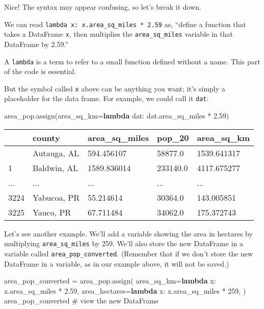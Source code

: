 \documentclass[
  letterpaper,
  DIV=11,
  numbers=noendperiod]{scrreprt}
\newenvironment{Shaded}{\begin{snugshade}}{\end{snugshade}}
\newcommand{\CommentTok}[1]{\textcolor[rgb]{0.37,0.37,0.37}{#1}}
\newcommand{\DecValTok}[1]{\textcolor[rgb]{0.68,0.00,0.00}{#1}}
\newcommand{\FloatTok}[1]{\textcolor[rgb]{0.68,0.00,0.00}{#1}}
\newcommand{\KeywordTok}[1]{\textcolor[rgb]{0.00,0.23,0.31}{\textbf{#1}}}
\newcommand{\NormalTok}[1]{\textcolor[rgb]{0.00,0.23,0.31}{#1}}
\newcommand{\OperatorTok}[1]{\textcolor[rgb]{0.37,0.37,0.37}{#1}}
\begin{document}
Nice! The syntax may appear confusing, so let's break it down.

We can read \texttt{lambda\ x:\ x.area\_sq\_miles\ *\ 2.59} as, ``define
a function that takes a DataFrame \texttt{x}, then multiplies the
\texttt{area\_sq\_miles} variable in that DataFrame by 2.59.''

A \texttt{lambda} is a term to refer to a small function defined without
a name. This part of the code is essential.

But the symbol called \texttt{x} above can be anything you want; it's
simply a placeholder for the data frame. For example, we could call it
\texttt{dat}:

\begin{Shaded}
\begin{Highlighting}[]
\NormalTok{area\_pop.assign(area\_sq\_km}\OperatorTok{=}\KeywordTok{lambda}\NormalTok{ dat: dat.area\_sq\_miles }\OperatorTok{*} \FloatTok{2.59}\NormalTok{)}
\end{Highlighting}
\end{Shaded}

\begin{longtable}[]{@{}lllll@{}}
\toprule\noalign{}
& county & area\_sq\_miles & pop\_20 & area\_sq\_km \\
\midrule\noalign{}
\endhead
\bottomrule\noalign{}
\endlastfoot
0 & Autauga, AL & 594.456107 & 58877.0 & 1539.641317 \\
1 & Baldwin, AL & 1589.836014 & 233140.0 & 4117.675277 \\
... & ... & ... & ... & ... \\
3224 & Yabucoa, PR & 55.214614 & 30364.0 & 143.005851 \\
3225 & Yauco, PR & 67.711484 & 34062.0 & 175.372743 \\
\end{longtable}

Let's see another example. We'll add a variable showing the area in
hectares by multiplying \texttt{area\_sq\_miles} by 259. We'll also
store the new DataFrame in a variable called
\texttt{area\_pop\_converted}. (Remember that if we don't store the new
DataFrame in a variable, as in our example above, it will not be saved.)

\begin{Shaded}
\begin{Highlighting}[]
\NormalTok{area\_pop\_converted }\OperatorTok{=}\NormalTok{ area\_pop.assign(}
\NormalTok{    area\_sq\_km}\OperatorTok{=}\KeywordTok{lambda}\NormalTok{ x: x.area\_sq\_miles }\OperatorTok{*} \FloatTok{2.59}\NormalTok{,}
\NormalTok{    area\_hectares}\OperatorTok{=}\KeywordTok{lambda}\NormalTok{ x: x.area\_sq\_miles }\OperatorTok{*} \DecValTok{259}\NormalTok{,}
\NormalTok{)}
\NormalTok{area\_pop\_converted  }\CommentTok{\# view the new DataFrame}
\end{Highlighting}
\end{Shaded}
\end{document}
